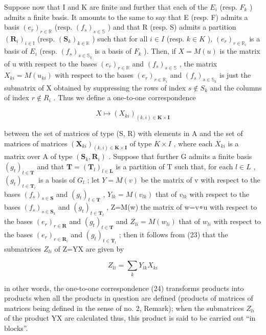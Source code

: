 Suppose now that I and K are finite and further that each of the \(E_{i}\) (resp. \(F_{k}\) ) admits a finite basis. It amounts to the same to say that E (resp. F) admits a basis \((e_{r})_{r\in\mathbb{R}}\) (resp. \((f_{s})_{s\in\mathbb{S}}\) ) and that R (resp. S) admits a partition \((\mathbf{R}_{i})_{i\in\mathbb{I}}\) (resp. \((\mathbf{S}_{k})_{k\in\mathbb{K}}\) ) such that for all \(i\in I\) (resp. \(k\in K\) ), \((e_{r})_{r\in\mathbb{R}_{i}}\) is a basis of \(E_{i}\) (resp. \((f_{s})_{s\in\mathbb{S}_{k}}\) is a basis of \(F_{k}\) ). Then, if \(X=M(u)\) is the matrix of u with respect to the bases \((e_{r})_{r\in\mathbb{R}}\) and \((f_{s})_{s\in\mathbb{S}}\) , the matrix \(X_{ki}=M(u_{ki})\) with respect to the bases \((e_{r})_{r\in\mathbb{R}_{i}}\) and \((f_{s})_{s\in\mathbb{S}_{k}}\) is just the submatrix of X obtained by suppressing the rows of index \(s\notin S_{k}\) and the columns of index \(r\notin R_{i}\) . Thus we define a one-to-one correspondence

\[
X \mapsto (X _ {k i}) _ {(k, i) \in \mathbf {K} \times \mathbf {I}}\tag{24}
\]

between the set of matrices of type (S, R) with elements in A and the set of matrices of matrices \((\mathbf{X}_{ki})_{(k,i)\in\mathbf{K}\times\mathbf{I}}\) of type \(K\times I\) , where each \(X_{ki}\) is a matrix over A of type \((\mathbf{S}_{k},\mathbf{R}_{i})\) . Suppose that further G admits a finite basis \((g_{t})_{t\in\mathbf{T}}\) and that \(\mathbf{T}=(\mathbf{T}_{l})_{l\in\mathbf{L}}\) is a partition of T such that, for each \(l\in L\) , \((g_{t})_{t\in\mathbf{T}_{l}}\) is a basis of \(G_{l}\) ; let \(Y=M(v)\) be the matrix of v with respect to the bases \((f_{s})_{s\in\mathbf{S}}\) and \((g_{t})_{t\in\mathbf{T}}\) , \(Y_{lk}=M(v_{lk})\) that of \(v_{lk}\) with respect to the bases \((f_{s})_{s\in\mathbf{S}_{k}}\) and \((g_{t})_{t\in\mathbf{T}_{l}}\) , Z=M(w) the matrix of w=v∘u with respect to the bases \((e_{r})_{r\in\mathbf{R}}\) and \((g_{t})_{t\in\mathbf{T}}\) and \(Z_{li}=M(w_{li})\) that of \(w_{li}\) with respect to the bases \((e_{r})_{r\in\mathbf{R}_{i}}\) and \((g_{t})_{t\in\mathbf{T}_{l}}\) ; then it follows from (23) that the submatrices \(Z_{li}\) of Z=YX are given by

\[
Z _ {l i} = \sum_ {k} Y _ {l k} X _ {k i}\tag{25}
\]

in other words, the one-to-one correspondence (24) transforms products into products when all the products in question are defined (products of matrices of matrices being defined in the sense of no. 2, Remark); when the submatrices \(Z_{li}\) of the product YX are calculated thus, this product is said to be carried out ``in blocks''.

